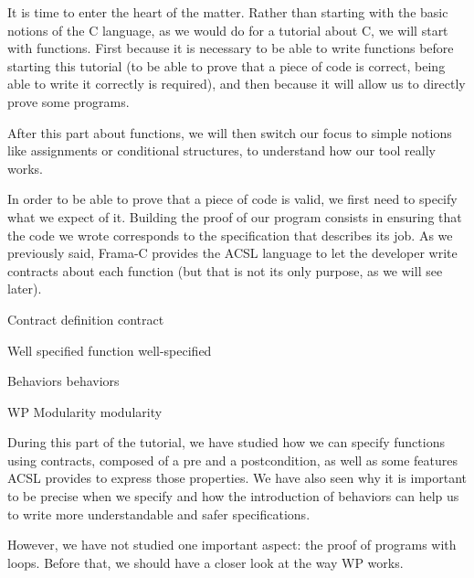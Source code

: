 It is time to enter the heart of the matter. Rather than starting with
the basic notions of the C language, as we would do for a tutorial about C,
we will start with functions. First because it is necessary to be able
to write functions before starting this tutorial (to be able to prove
that a piece of code is correct, being able to write it correctly is required), and
then because it will allow us to directly prove some programs.



After this part about functions, we will then switch our focus to simple
notions like assignments or conditional structures, to understand how our
tool really works.



In order to be able to prove that a piece of code is valid, we first need to
specify what we expect of it. Building the proof of our program consists
in ensuring that the code we wrote corresponds to the specification that
describes its job. As we previously said, Frama-C provides the ACSL
language to let the developer write contracts about each function (but
that is not its only purpose, as we will see later).



\begin{levelTwo}
  {Contract definition}
  {contract}
\end{levelTwo}

\begin{levelTwo}
  {Well specified function}
  {well-specified}
\end{levelTwo}

\begin{levelTwo}
  {Behaviors}
  {behaviors}
\end{levelTwo}

\begin{levelTwo}
  {WP Modularity}
  {modularity}
\end{levelTwo}


\horizontalLine
\newpage


During this part of the tutorial, we have studied how we can specify
functions using contracts, composed of a pre and a postcondition, as
well as some features ACSL provides to express those properties. We have
also seen why it is important to be precise when we specify and how the
introduction of behaviors can help us to write more understandable and
safer specifications.

However, we have not studied one important aspect: the proof of programs
with loops. Before that, we should have a closer look at the way WP works.
